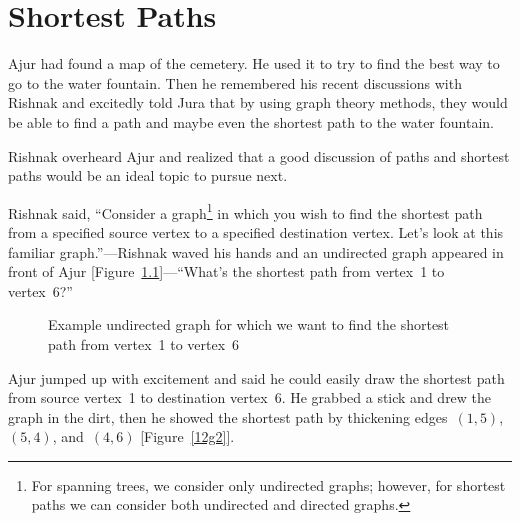 \chapter{Shortest Paths}
Ajur had found a map of the cemetery. He used it to try to find the best way to go to the water fountain. Then he remembered his recent discussions with Rishnak and excitedly told Jura that by using graph theory methods, they would be able to find a path and maybe even the shortest path to the water fountain.

Rishnak overheard Ajur and realized that a good discussion of paths and shortest paths would be an ideal topic to pursue next.

Rishnak said, ``Consider a graph\footnote{For spanning trees, we consider only undirected graphs; however, for shortest paths we can consider both undirected and directed graphs.} in which you wish to find the shortest path from a specified source vertex to a specified destination vertex. Let's look at this familiar graph.''---Rishnak waved his hands and an undirected graph appeared in front of Ajur [Figure~\ref{12g1}]---``What's the shortest path from vertex~1 to vertex~6?''

\begin{figure}
\begin{center}
\caption{Example undirected graph for which we want to find the shortest path from vertex~1 to vertex~6}\label{12g1}
\end{center}
\end{figure}

Ajur jumped up with excitement and said he could easily draw the shortest path from source vertex~1 to destination vertex~6. He grabbed a stick and drew the graph in the dirt, then he showed the shortest path by thickening edges~$(1,5)$, $(5,4)$, and~$(4,6)$ [Figure~\ref{12g2}].

